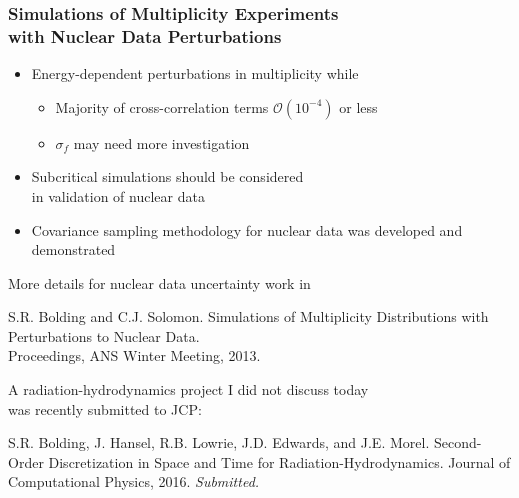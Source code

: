 \begin{frame}
\frametitle{Simulations of Multiplicity Experiments \\ with Nuclear Data Perturbations}
	\vspace{-0.2in}
\begin{itemize}
    \item[] Energy-dependent \nubar perturbations  in multiplicity while  \keff
      \begin{itemize}\vspace{0.1in}
		\item Majority of cross-correlation terms $\mathcal{O}(10^{-4})$ or less
            \vspace{-0.1in}
        \item $\sigma_f$ may need more investigation
            \\ 
	  \end{itemize}
      \item[] Subcritical simulations should be considered \\ in validation of nuclear data
      \item[] Covariance sampling methodology for nuclear data was developed and demonstrated
\end{itemize}
\end{frame} 

\begin{frame}
    More details for nuclear data uncertainty work in
    \begin{tcolorbox}
    S.R. Bolding and C.J. Solomon. 
    Simulations of Multiplicity Distributions with Perturbations to
    Nuclear Data.\\ Proceedings, ANS Winter Meeting, 2013.
    \end{tcolorbox}
    \vspace{0.3in}
    A radiation-hydrodynamics project I did not discuss today  \\ was recently submitted
    to JCP:
    \begin{tcolorbox}
    S.R. Bolding, J. Hansel, R.B. Lowrie, J.D. Edwards, and J.E. Morel. Second-Order
    Discretization in Space and Time for Radiation-Hydrodynamics. Journal of Computational
    Physics, 2016. \emph{Submitted.}
    \end{tcolorbox}
\end{frame}


